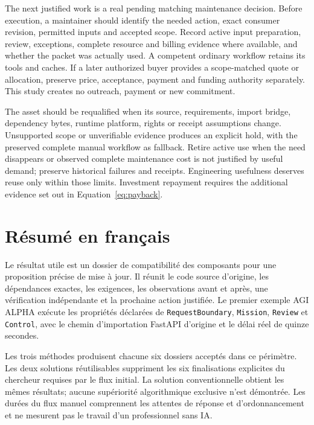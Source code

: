 \documentclass[11pt,a4paper]{article}
\begin{document}
The next justified work is a real pending matching maintenance decision. Before execution, a maintainer should identify the needed action, exact consumer revision, permitted inputs and accepted scope. Record active input preparation, review, exceptions, complete resource and billing evidence where available, and whether the packet was actually used. A competent ordinary workflow retains its tools and caches. If a later authorized buyer provides a scope-matched quote or allocation, preserve price, acceptance, payment and funding authority separately. This study creates no outreach, payment or new commitment.\cite{human}

The asset should be requalified when its source, requirements, import bridge, dependency bytes, runtime platform, rights or receipt assumptions change. Unsupported scope or unverifiable evidence produces an explicit hold, with the preserved complete manual workflow as fallback. Retire active use when the need disappears or observed complete maintenance cost is not justified by useful demand; preserve historical failures and receipts. Engineering usefulness deserves reuse only within those limits. Investment repayment requires the additional evidence set out in Equation~\ref{eq:payback}.

\section*{R\'esum\'e en fran\c{c}ais}

Le r\'esultat utile est un dossier de compatibilit\'e des composants pour une proposition pr\'ecise de mise \`a jour. Il r\'eunit le code source d'origine, les d\'ependances exactes, les exigences, les observations avant et apr\`es, une v\'erification ind\'ependante et la prochaine action justifi\'ee. Le premier exemple AGI ALPHA ex\'ecute les propri\'et\'es d\'eclar\'ees de \texttt{RequestBoundary}, \texttt{Mission}, \texttt{Review} et \texttt{Control}, avec le chemin d'importation FastAPI d'origine et le d\'elai r\'eel de quinze secondes.

Les trois m\'ethodes produisent chacune six dossiers accept\'es dans ce p\'erim\`etre. Les deux solutions r\'eutilisables suppriment les six finalisations explicites du chercheur requises par le flux initial. La solution conventionnelle obtient les m\^emes r\'esultats; aucune sup\'eriorit\'e algorithmique exclusive n'est d\'emontr\'ee. Les dur\'ees du flux manuel comprennent les attentes de r\'eponse et d'ordonnancement et ne mesurent pas le travail d'un professionnel sans IA.
\end{document}
